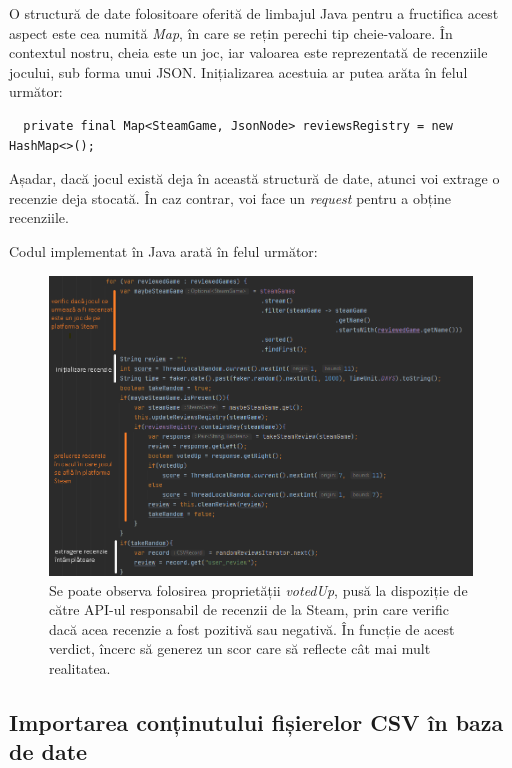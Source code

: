 \documentclass[12pt,a4paper]{report}
\begin{document}
O structură de date folositoare oferită de limbajul Java pentru a fructifica acest aspect este cea numită \emph{Map}, în care se rețin perechi tip cheie-valoare. În contextul nostru, cheia este un joc, iar valoarea este reprezentată de recenziile jocului, sub forma unui JSON. Inițializarea acestuia ar putea arăta în felul următor:

\begin{verbatim}
  private final Map<SteamGame, JsonNode> reviewsRegistry = new HashMap<>();
\end{verbatim}

Așadar, dacă jocul există deja în această structură de date, atunci voi extrage o recenzie deja stocată. În caz contrar, voi face un \emph{request} pentru a obține recenziile.

Codul implementat în Java arată în felul următor:

\begin{figure}[H]
\centering
\caption{}
\includegraphics[scale = 0.7]{exemplu_14_review_code_java}
\caption*{Se poate observa folosirea proprietății \emph{votedUp}, pusă la dispoziție de către API-ul responsabil de recenzii de la Steam, prin care verific dacă acea recenzie a fost pozitivă sau negativă. În funcție de acest verdict, încerc să generez un scor care să reflecte cât mai mult realitatea.}
\end{figure}


\subsection{Importarea conținutului fișierelor CSV în baza de date}
\end{document}
